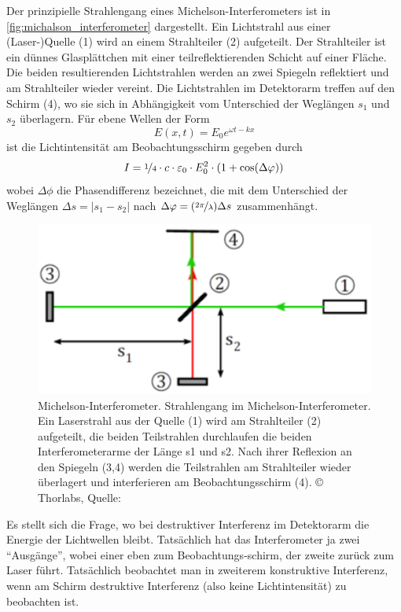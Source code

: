 \documentclass[ngerman]{scrartcl}
\begin{document}
Der prinzipielle Strahlengang eines Michelson-Interferometers ist in \autoref{fig:michalson_interferometer} dargestellt. Ein Lichtstrahl aus einer (Laser-)Quelle (1) wird an einem Strahlteiler (2) aufgeteilt. Der Strahlteiler ist ein dünnes Glasplättchen mit einer teilreflektierenden Schicht auf einer Fläche. Die beiden resultierenden Lichtstrahlen werden an zwei Spiegeln reflektiert und am Strahlteiler wieder vereint. Die Lichtstrahlen im Detektorarm treffen auf den Schirm (4), wo sie sich in Abhängigkeit vom Unterschied der Weglängen $s_1$ und $s_2$ überlagern. Für ebene Wellen der Form
\begin{equation}
    E(x,t) = E_0 e^{\omega t - k x}
\end{equation}
ist die Lichtintensität am Beobachtungsschirm gegeben durch
\begin{equation}
    I = \nicefrac{1}{4} \cdot c \cdot \varepsilon_0 \cdot E_0^2 \cdot (1 + \cos(\Delta \varphi))
\end{equation}
wobei $\Delta \phi$ die Phasendifferenz bezeichnet, die mit dem Unterschied der Weglängen\linebreak
$\Delta s = \left| s_1 - s_2 \right|$ nach $\Delta \varphi = (\nicefrac{2 \pi}{\lambda})\Delta s$ zusammenhängt.

\begin{figure}[H]
    \centering
    \begin{samepage}
        \includegraphics[width=0.6\linewidth]{fig/Angabe_Abb8.png}
        \caption[Michelson-Interferometer]{Michelson-Interferometer. Strahlengang im Michelson-Interferometer. Ein Laserstrahl aus der Quelle (1) wird am Strahlteiler (2) aufgeteilt, die beiden Teilstrahlen durchlaufen die beiden Interferometerarme der Länge s1 und s2. Nach ihrer Reflexion an den Spiegeln (3,4) werden die Teilstrahlen am Strahlteiler wieder überlagert und interferieren am Beobachtungsschirm (4). \copyright{} Thorlabs, Quelle: \cite{ref:angabe}}
        \label{fig:michalson_interferometer}
    \end{samepage}
\end{figure}

Es stellt sich die Frage, wo bei destruktiver Interferenz im Detektorarm die Energie der Lichtwellen bleibt. Tatsächlich hat das Interferometer ja zwei \enquote{Ausgänge}, wobei einer eben zum Beobachtungs-schirm, der zweite zurück zum Laser führt. Tatsächlich beobachtet man in zweiterem konstruktive Interferenz, wenn am Schirm destruktive Interferenz (also keine Lichtintensität) zu beobachten ist.
\end{document}

